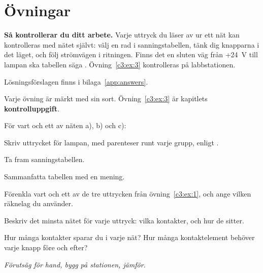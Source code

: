 
\section{Övningar}
\label{c3:sec:exercises}\label{c3:app:b}

\begin{aside}
\textbf{Så kontrollerar du ditt arbete.} Varje uttryck du läser av ur ett nät kan kontrolleras med
nätet självt: välj en rad i sanningstabellen, tänk dig knapparna i det läget, och följ strömvägen i
ritningen. Finns det en sluten väg från +24~V till lampan ska tabellen säga .
Övning~\ref{c3:ex:3} kontrolleras på labbstationen.

Lösningsförslagen finns i bilaga~\ref{app:answers}.

Varje övning är märkt med sin sort. Övning~\ref{c3:ex:3} är kapitlets \textbf{kontrolluppgift}.
\end{aside}

\label{c3:ex:1}


\noindent För vart och ett av näten a), b) och c):
\begin{parts}
  \item Skriv uttrycket för lampan, med parenteser runt varje grupp, enligt .
  \item Ta fram sanningstabellen.
  \item Sammanfatta tabellen med en mening.
\end{parts}

\label{c3:ex:2}
\begin{parts}
  \item Förenkla vart och ett av de tre uttrycken från övning~\ref{c3:ex:1}, och ange vilken
    räknelag du använder.
  \item Beskriv det minsta nätet för varje uttryck: vilka kontakter, och hur de sitter.
  \item Hur många kontakter sparar du i varje nät? Hur många kontaktelement behöver varje knapp
    före och efter?
\end{parts}

\label{c3:ex:3}
\emph{Förutsäg för hand, bygg på stationen, jämför.}


